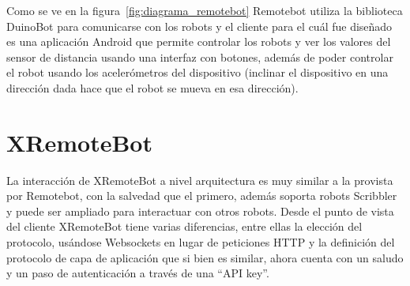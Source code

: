Como se ve en la figura~\ref{fig:diagrama_remotebot} Remotebot utiliza la
biblioteca DuinoBot para comunicarse con los robots y el cliente para el cuál
fue diseñado es una aplicación Android que permite controlar los robots
y ver los valores del sensor de distancia usando una interfaz con botones,
además de poder controlar el robot usando los acelerómetros del dispositivo
(inclinar el dispositivo en una dirección dada hace que el robot se mueva
en esa dirección).

\section{XRemoteBot}\label{ch2:xremotebot}

La interacción de XRemoteBot a nivel arquitectura es muy similar a la provista por Remotebot,
con la salvedad que el primero, además soporta robots Scribbler y puede ser
ampliado para interactuar con otros robots. Desde el punto de vista del cliente
XRemoteBot tiene varias diferencias, entre ellas la elección del protocolo,
usándose Websockets en lugar de peticiones HTTP y la definición del protocolo
de capa de aplicación que si bien es similar, ahora cuenta con un saludo y
un paso de autenticación a través de una ``API key''.



